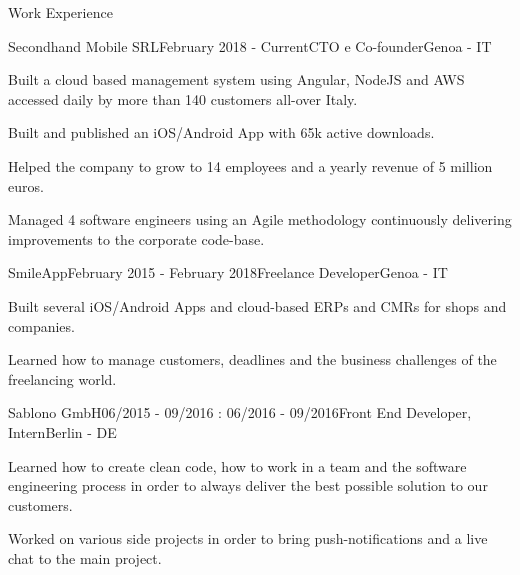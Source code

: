 \documentclass{resume} %
\begin{document}

\begin{rSection}{Work Experience}

\begin{rSubsection}{Secondhand Mobile SRL}{February 2018 - Current}{CTO e Co-founder}{Genoa - IT}
\item Built a cloud based management system using Angular, NodeJS and AWS accessed daily by more than 140 customers all-over Italy.
\item Built and published an iOS/Android App with 65k active downloads.
\item Helped the company to grow to 14 employees and a yearly revenue of 5 million euros.
\item Managed 4 software engineers using an Agile methodology continuously delivering improvements to the corporate code-base.
\end{rSubsection}


\begin{rSubsection}{SmileApp}{February 2015 - February 2018}{Freelance Developer}{Genoa - IT}
\item Built several iOS/Android Apps and cloud-based ERPs and CMRs for shops and companies.
\item Learned how to manage customers, deadlines and the business challenges of the freelancing world.
\end{rSubsection}


\begin{rSubsection}{Sablono GmbH}{06/2015 - 09/2016 : 06/2016 - 09/2016}{Front End Developer, Intern}{Berlin - DE}
\item Learned how to create clean code, how to work in a team and the software engineering process in order to always deliver the best possible solution to our customers.
\item Worked on various side projects in order to bring push-notifications and a live chat to the main project.
\end{rSubsection}

\end{rSection}

\end{document}
